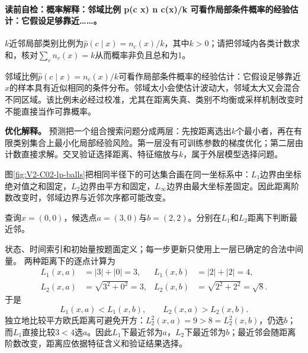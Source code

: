 \label{struct:V2-C02-CH15}
\paragraph{读前自检：概率解释：邻域比例 p(c x) n c(x)/k 可看作局部条件概率的经验估计：它假设足够靠近……。}$k$近邻局部类别比例为$\widehat p(c\mid x)=n_c(x)/k$，其中$k>0$；请把邻域内各类计数求和，核对$\sum_c n_c(x)=k$从而概率非负且总和为1。\par

\begin{probabilitybox}
邻域比例$\widehat p(c\mid x)=n_c(x)/k$可看作局部条件概率的经验估计：它假设足够靠近$x$的样本具有近似相同的条件分布。邻域太小会使估计波动大，邻域太大又会混合不同区域。该比例未必经过校准，尤其在距离失真、类别不均衡或采样机制改变时不能直接当作可靠概率。
\end{probabilitybox}

\label{struct:V2-C02-CH16}
\begin{optimizationbox}
\textbf{优化解释。}
\kNN{}预测把一个组合搜索问题分成两层：先按距离选出$k$个最小者，再在有限类别集合上最小化局部经验风险。第一层没有可训练参数的梯度优化；第二层由计数直接求解。交叉验证选择距离、特征缩放与$k$，属于外层模型选择问题。
\end{optimizationbox}

\label{struct:V2-C02-CH17}

图\ref{fig:V2-C02-lp-balls}把相同半径下的可达集合画在同一坐标系中：$L_1$边界由坐标绝对值之和固定，$L_2$边界由平方和固定，$L_\infty$边界由最大坐标差固定。因此距离阶数改变时，邻域边界与近邻次序都可能改变。

\label{struct:V2-C02-CH18}
\begin{example}[距离阶数改变近邻]\label{exm:V2-C02-lp-small}
查询$x=(0,0)$，候选点$a=(3,0)$与$b=(2,2)$。分别在$L_1$和$L_2$距离下判断最近邻。
\end{example}
\begin{solution}
\SolGiven 状态、时间索引和初始量按题面定义；每一步更新只使用上一层已确定的合法中间量。
\SolDerive
两种距离下的逐点计算为
\[
\begin{aligned}
L_1(x,a)&=|3|+|0|=3,&
L_1(x,b)&=|2|+|2|=4,\\
L_2(x,a)&=\sqrt{3^2+0^2}=3,&
L_2(x,b)&=\sqrt{2^2+2^2}=\sqrt8.
\end{aligned}
\]
于是
\[
L_1(x,a)<L_1(x,b),
\qquad
L_2(x,a)>L_2(x,b).
\]
独立地比较平方欧氏距离可避免开方：$L_2^2(x,a)=9>8=L_2^2(x,b)$，仍选$b$；而$L_1$直接比较$3<4$选$a$。因此$L_1$下最近邻为$a$，$L_2$下最近邻为$b$；最近邻会随距离阶数改变，距离应依据特征含义和验证结果选择。
\end{solution}


